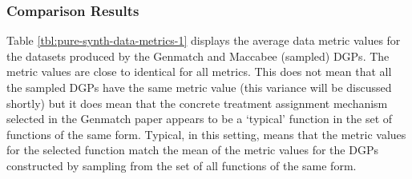 \documentclass[../main.tex]{subfiles}
\begin{document}
\subsubsection{Comparison Results}

Table \ref{tbl:pure-synth-data-metrics-1} displays the average data metric values for the datasets produced by the Genmatch and Maccabee (sampled) DGPs. The metric values are close to identical for all metrics. This does not mean that all the sampled DGPs have the same metric value (this variance will be discussed shortly) but it does mean that the concrete treatment assignment mechanism selected in the Genmatch paper appears to be a `typical' function in the set of functions of the same form. Typical, in this setting, means that the metric values for the selected function match the mean of the metric values for the DGPs constructed by sampling from the set of all functions of the same form.
\end{document}

